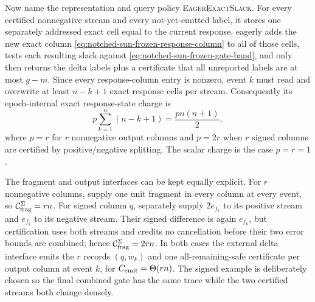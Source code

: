 \begin{proposition}
Now name the representation and query policy
\textsc{EagerExactSlack}.  For every certified nonnegative stream and every
not-yet-emitted label, it stores one separately addressed exact cell equal to
the current response, eagerly adds the new exact column
\cref{eq:notched-sun-frozen-response-column} to all of those cells, tests
each resulting slack against \cref{eq:notched-sun-frozen-gate-band}, and only
then returns the delta labels plus a certificate that all unreported labels
are at most $g-m$.  Since every response-column entry is nonzero, event $k$
must read and overwrite at least $n-k+1$ exact response cells per stream.
Consequently its epoch-internal exact response-state charge is
\begin{equation}
 p\sum_{k=1}^n(n-k+1)
 =\frac{p n(n+1)}2,
 \label{eq:notched-sun-eager-state-write-lower-bound}
\end{equation}
where $p=r$ for $r$ nonnegative output columns and $p=2r$ when $r$ signed
columns are certified by positive/negative splitting.  The scalar charge is
the case $p=r=1$.

The fragment and output interfaces can be kept equally explicit.  For $r$
nonnegative columns, supply one unit fragment in every column at every event,
so $\mathcal C_{\rm frag}^{\Sigma}=rn$.  For signed column $q$, separately
supply $2e_{f_k}$ to its positive stream and $e_{f_k}$ to its negative
stream.  Their signed difference is again $e_{f_k}$, but certification uses
both streams and credits no cancellation before their two error bounds are
combined; hence $\mathcal C_{\rm frag}^{\Sigma}=2rn$.  In both cases the
external delta interface emits the $r$ records $(q,w_k)$ and one
all-remaining-safe certificate per output column at event $k$, for
$C_{\rm emit}=\Theta(rn)$.  The signed example is deliberately chosen so the
final combined gate has the same trace while the two certified streams both
change densely.


\end{proposition}
